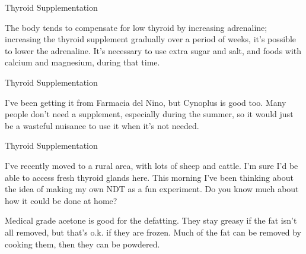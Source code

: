 \documentclass[11pt,oneside,openany,extrafontsizes]{memoir}
\begin{document}
\begin{standalonequote}{Thyroid Supplementation}

    \begin{answer}
      The body tends to compensate for low thyroid by increasing adrenaline; increasing the thyroid supplement gradually over a period of weeks, it's possible to lower the adrenaline. It's necessary to use extra sugar and salt, and foods with calcium and magnesium, during that time.
    \end{answer}
\end{standalonequote}

\begin{standalonequote}{Thyroid Supplementation}

    \begin{answer}
      I've been getting it from Farmacia del Nino, but Cynoplus is good too. Many people don't need a supplement, especially during the summer, so it would just be a wasteful nuisance to use it when it's not needed.
    \end{answer}
\end{standalonequote}

\begin{qaexchange}{Thyroid Supplementation}

    \begin{question}
        I've recently moved to a rural area, with lots of sheep and cattle. I'm sure I'd be able to access fresh thyroid glands here. This morning I've been thinking about the idea of making my own NDT as a fun experiment. Do you know much about how it could be done at home?
    \end{question}

    \begin{answer}
      Medical grade acetone is good for the defatting. They stay greasy if the fat isn't all removed, but that's o.k. if they are frozen. Much of the fat can be removed by cooking them, then they can be powdered.
    \end{answer}
\end{qaexchange}
\end{document}
